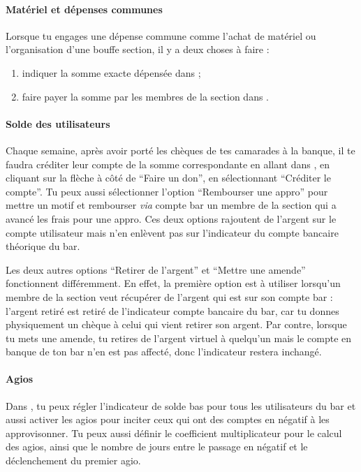 \documentclass[12pt,french]{article}
\begin{document}
\paragraph{Matériel et dépenses communes} Lorsque tu engages une dépense commune comme l'achat de matériel ou l'organisation d'une bouffe section, il y a deux choses à faire :
\begin{enumerate}
	\item indiquer la somme exacte dépensée dans  ;
	\item faire payer la somme par les membres de la section dans .
\end{enumerate}

\paragraph{Solde des utilisateurs} Chaque semaine, après avoir porté les chèques de tes camarades à la banque, il te faudra créditer leur compte de la somme correspondante en allant dans , en cliquant sur la flèche à côté de \enquote{Faire un don}, en sélectionnant \enquote{Créditer le compte}. Tu peux aussi sélectionner l'option \enquote{Rembourser une appro} pour mettre un motif et rembourser \emph{via} compte bar un membre de la section qui a avancé les frais pour une appro. Ces deux options rajoutent de l'argent sur le compte utilisateur mais n'en enlèvent pas sur l'indicateur du compte bancaire théorique du bar.

Les deux autres options \enquote{Retirer de l'argent} et \enquote{Mettre une amende} fonctionnent différemment. En effet, la première option est à utiliser lorsqu'un membre de la section veut récupérer de l'argent qui est sur son compte bar : l'argent retiré est retiré de l'indicateur compte bancaire du bar, car tu donnes physiquement un chèque à celui qui vient retirer son argent. Par contre, lorsque tu mets une amende, tu retires de l'argent virtuel à quelqu'un mais le compte en banque de ton bar n'en est pas affecté, donc l'indicateur restera inchangé.

\paragraph{Agios} Dans , tu peux régler l'indicateur de solde bas pour tous les utilisateurs du bar et aussi activer les agios pour inciter ceux qui ont des comptes en négatif à les approvisonner. Tu peux aussi définir le coefficient multiplicateur pour le calcul des agios, ainsi que le nombre de jours entre le passage en négatif et le déclenchement du premier agio.
\end{document}
